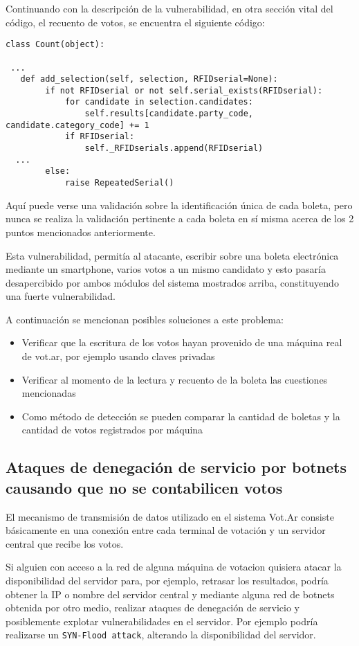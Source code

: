 Continuando con la descripción de la vulnerabilidad, en otra sección vital del código, el recuento de votos, se encuentra el siguiente código:

\begin{lstlisting}
class Count(object):

 ...
   def add_selection(self, selection, RFIDserial=None):
        if not RFIDserial or not self.serial_exists(RFIDserial):
            for candidate in selection.candidates:
                self.results[candidate.party_code, candidate.category_code] += 1
            if RFIDserial:
                self._RFIDserials.append(RFIDserial)
  ...
        else:
            raise RepeatedSerial()
\end{lstlisting}

Aquí puede verse una validación sobre la identificación única de cada boleta, pero nunca se realiza la validación pertinente a cada boleta en sí misma acerca de los 2 puntos mencionados anteriormente.

Esta vulnerabilidad, permitía al atacante, escribir sobre una boleta electrónica mediante un smartphone, varios votos a un mismo candidato y esto pasaría desapercibido por ambos módulos del sistema mostrados arriba, constituyendo una fuerte vulnerabilidad.

A continuación se mencionan posibles soluciones a este problema:

\begin{itemize}
	\item Verificar que la escritura de los votos hayan provenido de una máquina real de vot.ar, por ejemplo usando claves privadas
	\item Verificar al momento de la lectura y recuento de la boleta las cuestiones mencionadas
	\item Como método de detección se pueden comparar la cantidad de boletas y la cantidad de votos registrados por máquina
\end{itemize}


\subsection{Ataques de denegación de servicio por botnets causando que no se contabilicen votos}

El mecanismo de transmisión de datos utilizado en el sistema Vot.Ar consiste básicamente en una conexión entre cada terminal de votación y un servidor central que recibe los votos.

Si alguien con acceso a la red de alguna máquina de votacion quisiera atacar la disponibilidad del servidor para, por ejemplo, retrasar los resultados, podría obtener la IP o nombre del servidor central y mediante alguna red de botnets obtenida por otro medio, realizar ataques de denegación de servicio y posiblemente explotar vulnerabilidades en el servidor. Por ejemplo podría realizarse un \texttt{SYN-Flood attack}, alterando la disponibilidad del servidor.


